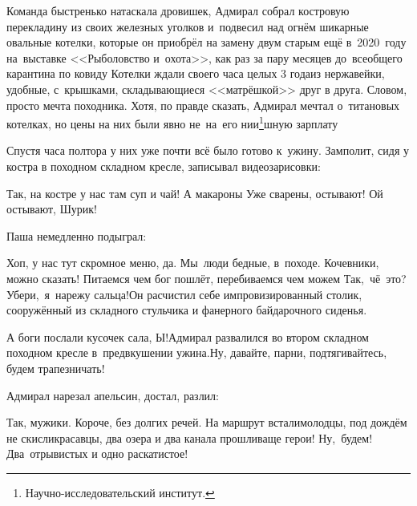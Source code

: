 \renewcommand*{\thefootnote}{\fnsymbol{footnote}}
\setcounter{footnote}{0}
Команда быстренько натаскала дровишек, Адмирал собрал костровую перекладину из своих железных уголков и~подвесил над огнём шикарные овальные котелки, которые он приобрёл на замену двум старым ещё в~2020~году на~выставке <<Рыболовство и~охота>>, как раз за пару месяцев до~всеобщего карантина по ковиду\myldots{} Котелки ждали своего часа целых 3 года\mdash из нержавейки, удобные, с~крышками, складывающиеся <<матрёшкой>> друг в друга. Словом, просто мечта походника. Хотя, по правде сказать, Адмирал мечтал о~титановых котелках, но цены на них были явно не~на~его нии\footnote{Научно-исследовательский институт.}\sdash шную зарплату\myldots{}




\myldots{}Спустя часа полтора у них уже почти всё было готово к~ужину. %
Замполит, сидя у костра в походном складном кресле, записывал видеозарисовки:

\diagdash Так, на костре у нас там суп и чай! А макароны\myldots{} Уже сварены, остывают! Ой остывают, Шурик!

Паша немедленно подыграл:

\diagdash Хоп, у нас тут скромное меню, да. Мы~люди бедные, в~походе. Кочевники, можно сказать! Питаемся чем бог пошлёт, перебиваемся чем можем\myldots{} Так,~чё~это? Убери,~я~нарежу сальца!\mdash Он расчистил себе импровизированный столик, сооружённый из складного стульчика и фанерного байдарочного сиденья.

\diagdash А боги послали кусочек сала, Ы!\mdash Адмирал развалился во втором складном походном кресле в~предвкушении ужина.\mdash Ну, давайте, парни, подтягивайтесь, будем трапезничать!

Адмирал нарезал апельсин, достал, разлил: 

\diagdash Так, мужики. Короче, без долгих речей. На маршрут встали\mdash молодцы, под дождём не скисли\mdash красавцы, два озера и два канала прошли\mdash ваще герои! Ну,~будем! Два~отрывистых и одно раскатистое!


